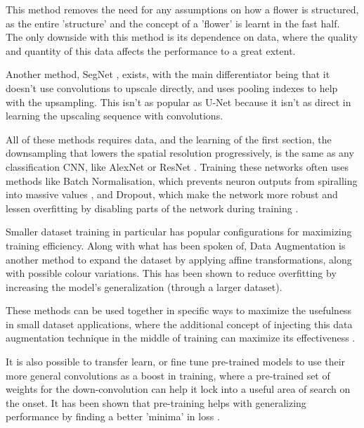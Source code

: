 \documentclass{article}
\begin{document}
This method removes the need for any assumptions on how a flower is structured, as the entire 'structure' and the concept of a 'flower' is learnt in the fast half. The only downside with this method is its dependence on data, where the quality and quantity of this data affects the performance to a great extent. 

Another method, SegNet \autocite{badrinarayananSegNetDeepConvolutional2017}, exists, with the main differentiator being that it doesn't use convolutions to upscale directly, and uses pooling indexes to help with the upsampling. This isn't as popular as U-Net because it isn't as direct in learning the upscaling sequence with convolutions. 

All of these methods requires data, and the learning of the first section, the downsampling that lowers the spatial resolution progressively, is the same as any classification CNN, like AlexNet or ResNet \autocite{krizhevskyImageNetClassificationDeep2012,heDeepResidualLearning2016}. Training these networks often uses methods like Batch Normalisation, which prevents neuron outputs from spiralling into massive values \autocite{ioffeBatchNormalizationAccelerating2015}, and Dropout, which make the network more robust and lessen overfitting by disabling parts of the network during training \autocite{srivastavaDropoutSimpleWay2014}. 

Smaller dataset training in particular has popular configurations for maximizing training efficiency. Along with what has been spoken of, Data Augmentation is another method to expand the dataset by applying affine transformations, along with possible colour variations. This has been shown to reduce overfitting \autocite{shortenSurveyImageData2019} by increasing the model's generalization (through a larger dataset).

These methods can be used together in specific ways to maximize the usefulness in small dataset applications, where the additional concept of injecting this data augmentation technique in the middle of training can maximize its effectiveness \autocite{thanapolReducingOverfittingImproving2020}. 

It is also possible to transfer learn, or fine tune pre-trained models to use their more general convolutions as a boost in training, where a pre-trained set of weights for the down-convolution can help it lock into a useful area of search on the onset. It has been shown that pre-training helps with generalizing performance by finding a better 'minima' in loss \autocite{pmlr-v9-erhan10a}.
\end{document}
